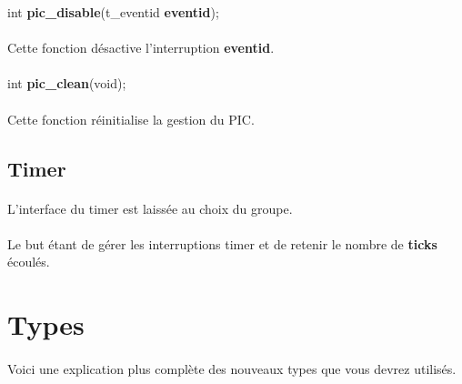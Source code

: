 \documentclass[10pt,a4wide]{article}
\begin{document}
\hspace{1.5cm}int \textbf{pic\_disable}(t\_eventid \textbf{eventid});

\paragraph{}

Cette fonction d\'esactive l'interruption \textbf{eventid}.

\paragraph{}

\hspace{1.5cm}int \textbf{pic\_clean}(void);

\paragraph{}

Cette fonction r\'einitialise la gestion du PIC.

\subsection{Timer}

\paragraph{}

L'interface du timer est laiss\'ee au choix du groupe.

\paragraph{}

Le but \'etant de g\'erer les interruptions timer et de retenir le nombre
de \textbf{ticks} \'ecoul\'es.

\section{Types}

\paragraph{}

Voici une explication plus compl\`ete des nouveaux types que
vous devrez utilis\'es.

\paragraph{}
\end{document}
